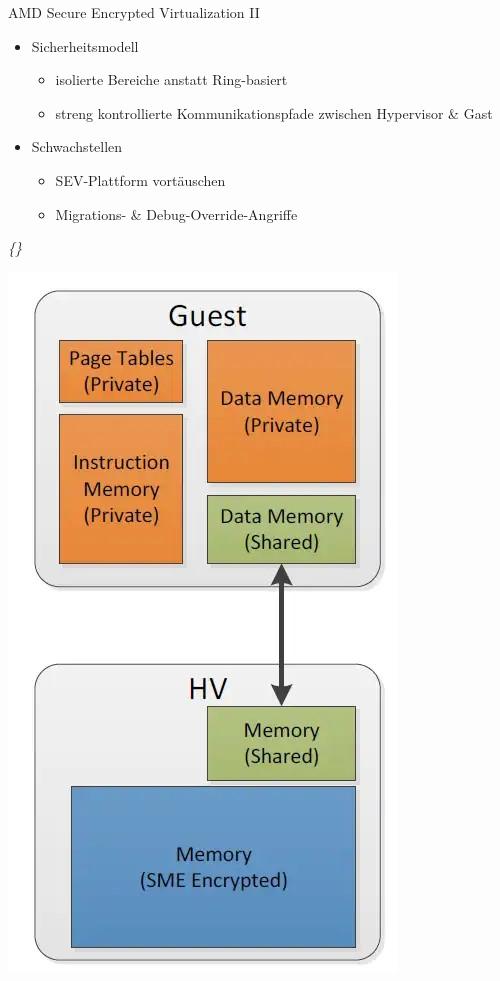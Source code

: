 \documentclass{sdqbeamer}
\begin{document}
\begin{frame}{AMD Secure Encrypted Virtualization II}
	\begin{minipage}{0.7\linewidth}
		\begin{itemize}
			\item Sicherheitsmodell
			\begin{itemize}
				\item isolierte Bereiche anstatt Ring-basiert
				\item streng kontrollierte Kommunikationspfade zwischen Hypervisor \& Gast
			\end{itemize}
			\item Schwachstellen
			\begin{itemize}
				\item SEV-Plattform vortäuschen
				\item Migrations- \& Debug-Override-Angriffe
			\end{itemize}
		\end{itemize}
		\vspace{3ex}
		\vfill
		\small\textit{\{\cite{kaplan, buhren}\}}
	\end{minipage}
	\begin{minipage}{0.29\linewidth}
		\begin{center}
			\includegraphics[width=0.65\linewidth]{Bilder/AMD_Guest_HV.jpg} \\

\end{center}
\end{minipage}
\end{frame}
\end{document}
